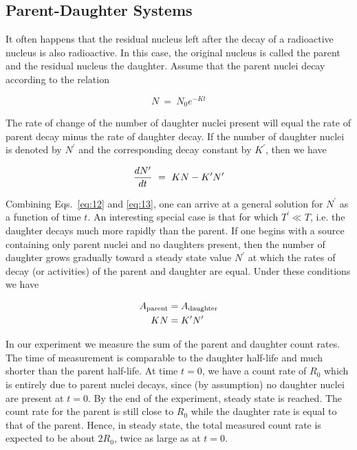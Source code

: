 \subsection{Parent-Daughter Systems}
\label{sec:parent-daughter}

It often happens that the residual nucleus left after the decay of a
radioactive nucleus is also radioactive.  In this case, the original
nucleus is called the parent and the residual nucleus the daughter.
Assume that the parent nuclei decay according to the relation

\begin{equation}
N ~=~ N_0 e^{-Kt}
\label{eq:12}
\end{equation}

The rate of change of the number of daughter nuclei present will equal
the rate of parent decay minus the rate of daughter decay.  If the
number of daughter nuclei is denoted by $N^\prime$ and the
corresponding decay constant by $K^\prime$, then we have

\begin{equation}
{dN^\prime \over dt} ~=~ KN - K^\prime N^\prime
\label{eq:13}
\end{equation}

Combining Eqs.~\ref{eq:12} and \ref{eq:13}, one can arrive at a general solution for
$N^\prime$ as a function of time $t$.
An interesting special case is that for which
$T^\prime \ll T$, i.e. the daughter decays
much more rapidly than the parent. If one begins with a source
containing only parent nuclei and no daughters present, then the
number of daughter grows gradually toward a steady
state value $N^\prime$ at which the rates of decay (or
activities) of the parent and daughter are equal.  Under these
conditions we have

\begin{align}
A_{\rm parent} & = A_{\rm daughter} \\
KN & = K^\prime N^\prime
\label{eq:14}
\end{align}

In our experiment we measure the sum of the parent and daughter count rates.
The time of measurement is comparable to the daughter half-life and much shorter
than the parent half-life.  At time $t = 0$, we have a count rate of $R_0$ which
is entirely due to parent nuclei decays, since (by assumption) no daughter
nuclei are present at $t = 0$.  By the end of the experiment, steady state is
reached.  The count rate for the parent is still close to $R_0$
while the daughter rate is equal to that of the parent.  Hence, in steady state,
the total measured count rate is expected to be about $2R_0$, twice as large as
at $t = 0$.

